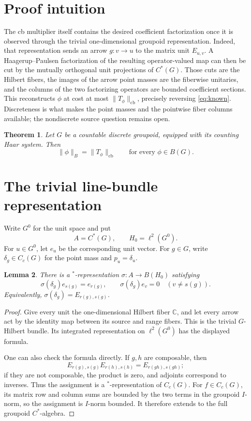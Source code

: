 \documentclass[11pt]{article}
\newtheorem{theorem}{Theorem}
\newtheorem{lemma}[theorem]{Lemma}
\theoremstyle{remark}
\newcommand{\C}{\mathbb C}
\newcommand{\cb}{\mathrm{cb}}
\begin{document}
\section{Proof intuition}

The cb multiplier itself contains the desired coefficient factorization once
it is observed through the trivial one-dimensional groupoid representation.
Indeed, that representation sends an arrow \(g:v\to u\) to the matrix unit
\(E_{u,v}\).  A Haagerup--Paulsen factorization of the resulting
operator-valued map can then be cut by the mutually orthogonal unit
projections of \(C^*(G)\).  Those cuts are the Hilbert fibers, the images of
the arrow point masses are the fiberwise unitaries, and the columns of the two
factorizing operators are bounded coefficient sections.  This reconstructs
\(\phi\) at cost at most \(\|T_\phi\|_{\cb}\), precisely reversing
\eqref{eq:known}.  Discreteness is what makes the point masses and the
pointwise fiber columns available; the nondiscrete source question remains
open.

\begin{theorem}\label{thm:main}
Let \(G\) be a countable discrete groupoid, equipped with its counting Haar
system.  Then
\[
 \|\phi\|_B=\|T_\phi\|_{\cb}
 \qquad\text{for every }\phi\in B(G).
\]
\end{theorem}

\section{The trivial line-bundle representation}

Write \(G^0\) for the unit space and put
\[
 A=C^*(G),\qquad H_0=\ell^2(G^0).
\]
For \(u\in G^0\), let \(e_u\) be the corresponding unit vector.  For
\(g\in G\), write \(\delta_g\in C_c(G)\) for the point mass and
\(p_u=\delta_u\).

\begin{lemma}\label{lem:sigma}
There is a \(^{*}\)-representation
\(\sigma:A\to B(H_0)\) satisfying
\[
 \sigma(\delta_g)e_{s(g)}=e_{r(g)},\qquad
 \sigma(\delta_g)e_v=0\quad(v\ne s(g)).
\]
Equivalently, \(\sigma(\delta_g)=E_{r(g),s(g)}\).
\end{lemma}

\begin{proof}
Give every unit the one-dimensional Hilbert fiber \(\C\), and let every arrow
act by the identity map between its source and range fibers.  This is the
trivial \(G\)-Hilbert bundle.  Its integrated representation on
\(\ell^2(G^0)\) has the displayed formula.

One can also check the formula directly.  If \(g,h\) are composable, then
\[
 E_{r(g),s(g)}E_{r(h),s(h)}
 =E_{r(gh),s(gh)};
\]
if they are not composable, the product is zero, and adjoints correspond to
inverses.  Thus the assignment is a \(^{*}\)-representation of \(C_c(G)\).
For \(f\in C_c(G)\), its matrix row and column sums are bounded by the two
terms in the groupoid \(I\)-norm, so the assignment is \(I\)-norm bounded.
It therefore extends to the full groupoid \(C^*\)-algebra.
\end{proof}
\end{document}
